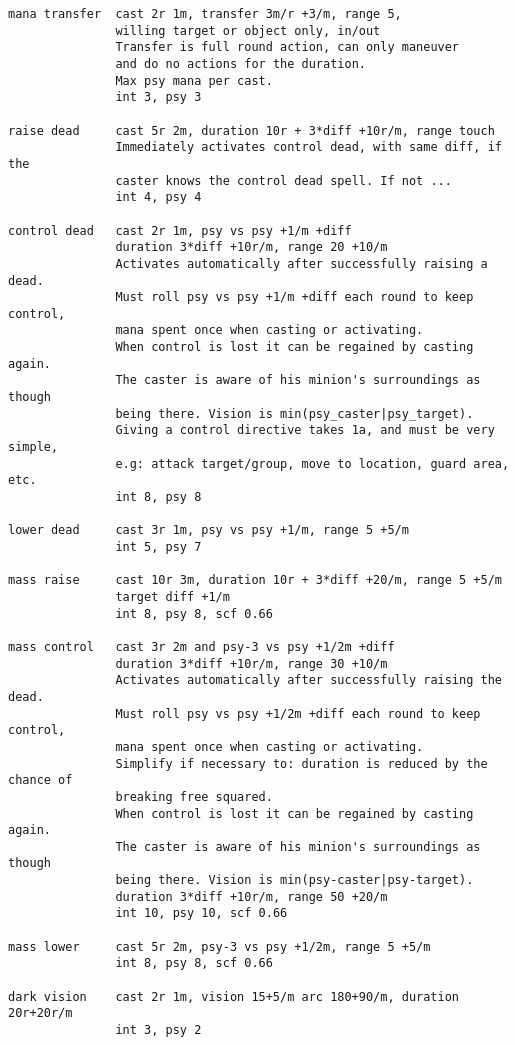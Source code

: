 \begin{verbatim}
mana transfer  cast 2r 1m, transfer 3m/r +3/m, range 5,
               willing target or object only, in/out
               Transfer is full round action, can only maneuver
               and do no actions for the duration.
               Max psy mana per cast.
               int 3, psy 3

raise dead     cast 5r 2m, duration 10r + 3*diff +10r/m, range touch
               Immediately activates control dead, with same diff, if the
               caster knows the control dead spell. If not ...
               int 4, psy 4

control dead   cast 2r 1m, psy vs psy +1/m +diff
               duration 3*diff +10r/m, range 20 +10/m
               Activates automatically after successfully raising a dead.
               Must roll psy vs psy +1/m +diff each round to keep control,
               mana spent once when casting or activating.
               When control is lost it can be regained by casting again.
               The caster is aware of his minion's surroundings as though
               being there. Vision is min(psy_caster|psy_target).
               Giving a control directive takes 1a, and must be very simple,
               e.g: attack target/group, move to location, guard area, etc.
               int 8, psy 8

lower dead     cast 3r 1m, psy vs psy +1/m, range 5 +5/m
               int 5, psy 7

mass raise     cast 10r 3m, duration 10r + 3*diff +20/m, range 5 +5/m
               target diff +1/m
               int 8, psy 8, scf 0.66

mass control   cast 3r 2m and psy-3 vs psy +1/2m +diff
               duration 3*diff +10r/m, range 30 +10/m
               Activates automatically after successfully raising the dead.
               Must roll psy vs psy +1/2m +diff each round to keep control,
               mana spent once when casting or activating.
               Simplify if necessary to: duration is reduced by the chance of
               breaking free squared.
               When control is lost it can be regained by casting again.
               The caster is aware of his minion's surroundings as though
               being there. Vision is min(psy-caster|psy-target).
               duration 3*diff +10r/m, range 50 +20/m
               int 10, psy 10, scf 0.66

mass lower     cast 5r 2m, psy-3 vs psy +1/2m, range 5 +5/m
               int 8, psy 8, scf 0.66

dark vision    cast 2r 1m, vision 15+5/m arc 180+90/m, duration 20r+20r/m
               int 3, psy 2


\end{verbatim}
